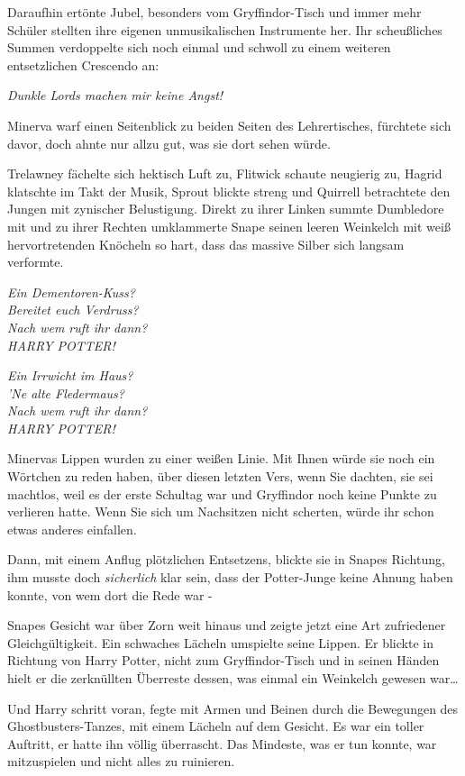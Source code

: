 {Daraufhin ertönte Jubel, besonders vom Gryffindor-Tisch und immer mehr Schüler stellten ihre eigenen unmusikalischen Instrumente her. Ihr scheußliches Summen verdoppelte sich noch einmal und schwoll zu einem weiteren entsetzlichen Crescendo an:

\emph{\emph{Dunkle Lords machen mir keine Angst!}}

Minerva warf einen Seitenblick zu beiden Seiten des Lehrertisches, fürchtete sich davor, doch ahnte nur allzu gut, was sie dort sehen würde.

Trelawney fächelte sich hektisch Luft zu, Flitwick schaute neugierig zu, Hagrid klatschte im Takt der Musik, Sprout blickte streng und Quirrell betrachtete den Jungen mit zynischer Belustigung. Direkt zu ihrer Linken summte Dumbledore mit und zu ihrer Rechten umklammerte Snape seinen leeren Weinkelch mit weiß hervortretenden Knöcheln so hart, dass das massive Silber sich langsam verformte.

\emph{Ein Dementoren-Kuss?\\ Bereitet euch Verdruss?\\ Nach wem ruft ihr dann?\\ HARRY POTTER!}

\emph{Ein Irrwicht im Haus?\\ 'Ne alte Fledermaus?\\ Nach wem ruft ihr dann?\\ HARRY POTTER!}

Minervas Lippen wurden zu einer weißen Linie. Mit Ihnen würde sie noch ein Wörtchen zu reden haben, über diesen letzten Vers, wenn Sie dachten, sie sei machtlos, weil es der erste Schultag war und Gryffindor noch keine Punkte zu verlieren hatte. Wenn Sie sich um Nachsitzen nicht scherten, würde ihr schon etwas anderes einfallen.

Dann, mit einem Anflug plötzlichen Entsetzens, blickte sie in Snapes Richtung, ihm musste doch \emph{sicherlich} klar sein, dass der Potter-Junge keine Ahnung haben konnte, von wem dort die Rede war -

Snapes Gesicht war über Zorn weit hinaus und zeigte jetzt eine Art zufriedener Gleichgültigkeit. Ein schwaches Lächeln umspielte seine Lippen. Er blickte in Richtung von Harry Potter, nicht zum Gryffindor-Tisch und in seinen Händen hielt er die zerknüllten Überreste dessen, was einmal ein Weinkelch gewesen war…

Und Harry schritt voran, fegte mit Armen und Beinen durch die Bewegungen des Ghostbusters-Tanzes, mit einem Lächeln auf dem Gesicht. Es war ein toller Auftritt, er hatte ihn völlig überrascht. Das Mindeste, was er tun konnte, war mitzuspielen und nicht alles zu ruinieren.

}
